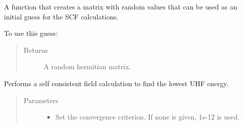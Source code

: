 \documentclass[letterpaper,10pt,english]{sphinxmanual}
\begin{document}
\begin{fulllineitems}
\begin{fulllineitems}
\label{\detokenize{cUHF_b:hf.HartreeFock.cUHF_b.MF.random_guess}}
A function that creates a matrix with random values that can be used as an initial guess
for the SCF calculations.

To use this guess:

\begin{sphinxVerbatim}[commandchars=\\\{\}]
   
          
   
  
\end{sphinxVerbatim}
\begin{quote}\begin{description}
\item[{Returns}] \leavevmode
A random hermitian matrix.

\end{description}\end{quote}

\end{fulllineitems}


\begin{fulllineitems}
\label{\detokenize{cUHF_b:hf.HartreeFock.cUHF_b.MF.scf}}
Performs a self consistent field calculation to find the lowest UHF energy.
\begin{quote}\begin{description}
\item[{Parameters}] \leavevmode\begin{itemize}
\item {} 
 \textendash{} Set the convergence criterion. If none is given, 1e-12 is used.


\end{itemize}
\end{description}
\end{quote}
\end{fulllineitems}
\end{fulllineitems}
\end{document}
